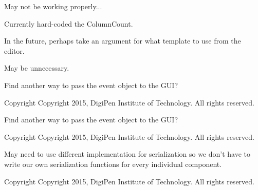 \begin{DoxyRefList}
\item[\label{todo__todo000037}%
\hypertarget{todo__todo000037}{}%
Member \hyperlink{classDCEngine_1_1Systems_1_1Factory_a7856a2fa567887c4721c81c9cbb9d54e}{D\-C\-Engine\-:\-:Systems\-:\-:Factory\-:\-:Destroy\-Spaces} ()]May not be working properly...  
\item[\label{todo__todo000040}%
\hypertarget{todo__todo000040}{}%
Member \hyperlink{classDCEngine_1_1Systems_1_1GraphicsGL_a05cb70091e1c5038a24c5abe887239d3}{D\-C\-Engine\-:\-:Systems\-:\-:Graphics\-G\-L\-:\-:Animation\-Update} (Components\-::\-Sprite \&sprite, float dt)]Currently hard-\/coded the Column\-Count.  
\item[\label{todo__todo000013}%
\hypertarget{todo__todo000013}{}%
Member \hyperlink{classDCEngine_1_1ZilchScript_a50442417ca9814ed60d4935b92d17951}{D\-C\-Engine\-:\-:Zilch\-Script\-:\-:Build\-Default\-From\-Template} ()]In the future, perhaps take an argument for what template to use from the editor.  
\item[\label{todo__todo000014}%
\hypertarget{todo__todo000014}{}%
Member \hyperlink{classDCEngine_1_1ZilchScript_a7d939b8e5652a98ea0f593a1a6c136e8}{D\-C\-Engine\-:\-:Zilch\-Script\-:\-:Include\-Script} ()]May be unnecessary.  
\item[\label{todo__todo000045}%
\hypertarget{todo__todo000045}{}%
File \hyperlink{Input_8cpp}{Input.cpp} ]Find another way to pass the event object to the G\-U\-I? \begin{DoxyCopyright}{Copyright}
Copyright 2015, Digi\-Pen Institute of Technology. All rights reserved.  
\end{DoxyCopyright}

\item[\label{todo__todo000046}%
\hypertarget{todo__todo000046}{}%
File \hyperlink{Input_8h}{Input.h} ]Find another way to pass the event object to the G\-U\-I? \begin{DoxyCopyright}{Copyright}
Copyright 2015, Digi\-Pen Institute of Technology. All rights reserved.  
\end{DoxyCopyright}

\item[\label{todo__todo000050}%
\hypertarget{todo__todo000050}{}%
File \hyperlink{Serialization_8cpp}{Serialization.cpp} ]May need to use different implementation for serialization so we don't have to write our own serialization functions for every individual component. \begin{DoxyCopyright}{Copyright}
Copyright 2015, Digi\-Pen Institute of Technology. All rights reserved.  
\end{DoxyCopyright}


\end{DoxyRefList}
